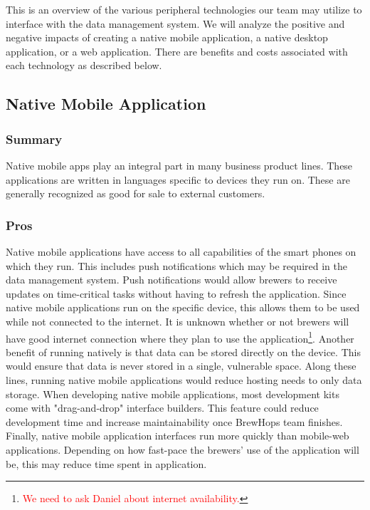 \documentclass[draftclsnofoot,onecolumn,letterpaper,10pt,compsoc]{IEEEtran}
\newcommand\question[1]{\footnote{\textcolor{red}{#1}}}
\begin{document}
    
        This is an overview of the various peripheral technologies our team may utilize to interface with the data management system. 
        We will analyze the positive and negative impacts of creating a native mobile application, a native desktop application, or a web application.
        There are benefits and costs associated with each technology as described below.

	\subsection{Native Mobile Application}
        \subsubsection{Summary}
            Native mobile apps play an integral part in many business product lines.
            These applications are written in languages specific to devices they run on.
            These are generally recognized as good for sale to external customers\cite{SearchCloudOverview}.

        \subsubsection{Pros}
            Native mobile applications have access to all capabilities of the smart phones on which they run. 
            This includes push notifications which may be required in the data management system. 
            Push notifications would allow brewers to receive updates on time-critical tasks without having to refresh the application.
            Since native mobile applications run on the specific device, this allows them to be used while not connected to the internet.
            It is unknown whether or not brewers will have good internet connection where they plan to use the application\question{We need to ask Daniel about internet availability.}.
            Another benefit of running natively is that data can be stored directly on the device.
            This would ensure that data is never stored in a single, vulnerable space.
            Along these lines, running native mobile applications would reduce hosting needs to only data storage.
            When developing native mobile applications, most development kits come with "drag-and-drop" interface builders. 
            This feature could reduce development time and increase maintainability once BrewHops team finishes.
            Finally, native mobile application interfaces run more quickly than mobile-web applications.
            Depending on how fast-pace the brewers' use of the application will be, this may reduce time spent in application.
\end{document}
